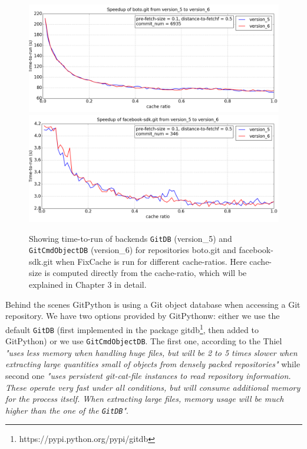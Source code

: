 \documentclass[12pt,twoside,notitlepage]{report}
\newcommand{\fxch}{FixCache}
\begin{document}
\begin{figure}[h]
\includegraphics[width=1.0\textwidth]{db_backend-1.png}
\includegraphics[width=1.0\textwidth]{db_backend-2.png}

\captionsetup{width=0.95\textwidth}
\caption{Showing time-to-run of backends \texttt{GitDB} (version\_5) and \texttt{GitCmdObjectDB} (version\_6) for repositories boto.git and facebook-sdk.git when \fxch{} is run for different cache-ratios. Here cache-size is computed directly from the cache-ratio, which will be explained in Chapter 3 in detail.}
\label{boto_gitdb}
\end{figure}
Behind the scenes GitPython is using a Git object database when accessing a Git repository. We have two options provided by GitPythonw: either we use the default \texttt{GitDB} (first implemented in the package gitdb\footnote{https://pypi.python.org/pypi/gitdb}, then added to GitPython) or we use \texttt{GitCmdObjectDB}. The first one, according to the Thiel \textit{"uses less memory when handling huge files, but will be 2 to 5 times slower when extracting large quantities
small of objects from densely packed repositories"} while second one \textit{"uses persistent git-cat-file instances to read repository information. These operate very fast under all conditions, but will consume additional memory for the process itself. When extracting large files, memory
usage will be much higher than the one of the \texttt{GitDB}"}.
\end{document}
